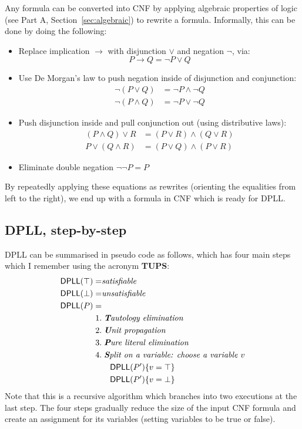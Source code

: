 Any formula can be converted into CNF by applying algebraic properties
of logic (see Part A, Section~\ref{sec:algebraic}) to rewrite a formula. Informally, this can be done by
doing the following:
%
\begin{itemize}[leftmargin=1em]
\item Replace implication $\rightarrow$ with disjunction $\vee$
and negation $\neg$, via: $$P \rightarrow Q = \neg P \vee Q$$
\item Use De Morgan's law to push negation inside of
disjunction and conjunction:
\begin{align*}
\neg (P \vee Q) & = \neg P \wedge \neg Q \\
\neg (P \wedge Q) & = \neg P \vee \neg Q
\end{align*}
\item Push disjunction inside and pull conjunction out (using
  distributive laws):
%
\begin{align*}
(P \wedge Q) \vee R & = (P \vee R) \wedge (Q \vee R) \\
P \vee (Q \wedge R) & = (P \vee Q) \wedge (P \vee R)
\end{align*}
\item Eliminate double negation $\neg\neg P = P$
%
\end{itemize}
%
By repeatedly applying these equations as rewrites (orienting the
equalities from left to the right), we end up with a formula
in CNF which is ready for DPLL.

\subsection{DPLL, step-by-step}

DPLL can be summarised in pseudo code as follows, which
has four main steps which I remember using the acronym \textbf{TUPS}:
%
\begin{align*}
\textsf{DPLL}(\top) = &\textit{satisfiable} \\
\textsf{DPLL}(\bot) = & \textit{unsatisfiable} \\
\textsf{DPLL}(P) = & \\
    1. & \; \textit{\textbf{T}autology elimination} \\
    2. & \; \textit{\textbf{U}nit propagation} \\
    3. & \; \textit{\textbf{P}ure literal elimination} \\
    4. & \; \textit{\textbf{S}plit on a variable: choose a variable $v$} \\
       &  \quad \textsf{DPLL}(P') \{v = \top\}  \\
       & \quad \textsf{DPLL}(P') \{v = \bot\}
\end{align*}
%
Note that this is a recursive algorithm which branches
into two executions at the last step.
The four steps gradually reduce the size of the input CNF formula and
create an assignment for its variables (setting variables to be true
or false). %

